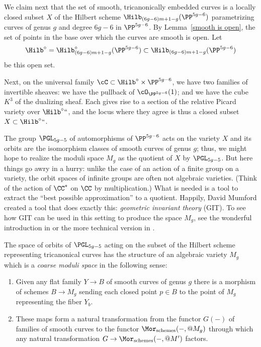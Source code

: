 We claim next that the set of smooth, tricanonically embedded curves
is a locally closed subset $X$ of the
Hilbert scheme
%
$\Hilb_{(6g-6)m+1-g}(\PP^{5g-6})$ parametrizing curves of genus $g$
and degree $6g-6$ in $\PP^{5g-6}$. By Lemma~\ref{smooth is open}, the
set of points in the base over which the curves are smooth is open. Let
$$
\Hilb^\circ = \Hilb^\circ_{(6g-6)m+1-g}(\PP^{5g-6})\subset \Hilb_{(6g-6)m+1-g}(\PP^{5g-6})
$$
be this open set.

Next, on the universal family
$\cC \subset \Hilb^\circ \times \PP^{5g-6}$,
we have two families of invertible sheaves: we have the
pullback of $\cO_{\PP^{5g-6}}(1)$; and we have the cube $K^3$ of the
dualizing sheaf. Each gives rise to a section of the relative
Picard variety
%
over $\Hilb^\circ` `$, and the locus where they agree is thus a
closed subset $X \subset \Hilb^\circ` `$.

The group $\PGL_{5g-5}$
of automorphisms of $\PP^{5g-6}$ acts on the variety $X$ and its orbits
%
%
are the isomorphism classes of smooth curves of genus $g$; thus, we might hope to realize the moduli space $M_g$ as the quotient of $X$ by $\PGL_{5g-5}$. But here things go awry in a hurry: unlike the case of an action of a finite group on a variety,
the orbit spaces of infinite groups are often not algebraic varieties.
(Think of the action of $\CC^*$ on $\CC$ by multiplication.) What is
needed is a tool to extract the ``best possible approximation'' to a
quotient. Happily, David Mumford created a tool that does exactly this:
\emph{geometric invariant theory}
%
%
(GIT).  To see how GIT can be
used in this  setting to produce the space $M_g$, see the wonderful
introduction in \cite{Mumford-Suominen}
or the more technical version in \cite{MR0450272}.

\begin{theorem}[Mumford]\label{unproved1}
The space of orbits of $\PGL_{5g-5}$ acting on the subset of the Hilbert scheme representing
%
tricanonical curves has the structure of an algebraic variety $M_g$ which is a \emph{coarse moduli
space} in the
%
following
sense:
\begin{enumerate}
 \item Given any flat family $Y\to B$ of smooth curves of genus $g$ there is a morphism of schemes
$B\to M_g$ sending each closed point $p\in B$ to the point of $M_g$
representing the fiber $Y\!_b$.
 \item These maps form a natural transformation from the functor $G(-)$ of families of smooth curves to the functor $\Mor_{\mathrm{ schemes}}(-,@ M_g)$
through which any natural transformation $G \to \Mor_{\mathrm{ schemes}}(-,@ M')$
 factors.
\end{enumerate}
\end{theorem}

